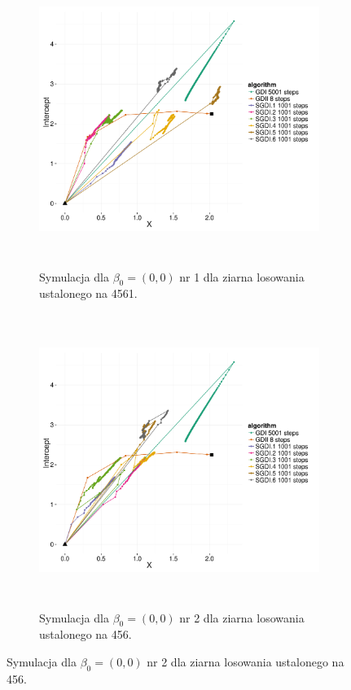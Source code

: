 \begin{figure}[h!]
  \begin{center}
   \begin{subfigure}[h!]{0.9\textwidth}
      \includegraphics[width=\textwidth, height=270pt]{Obrazki/sgd_00_1.pdf}
      \caption{Symulacja dla $\beta_0 = (0,0)$ nr 1 dla ziarna losowania ustalonego na 4561.}
   \end{subfigure}     
   \begin{subfigure}[h!]{0.9\textwidth}
      \includegraphics[width=\textwidth, height=270pt]{Obrazki/sgd_00_2.pdf}
      \caption{Symulacja dla $\beta_0 = (0,0)$ nr 2 dla ziarna losowania ustalonego na 456.}
   \end{subfigure}  \end{center}

\end{figure}
